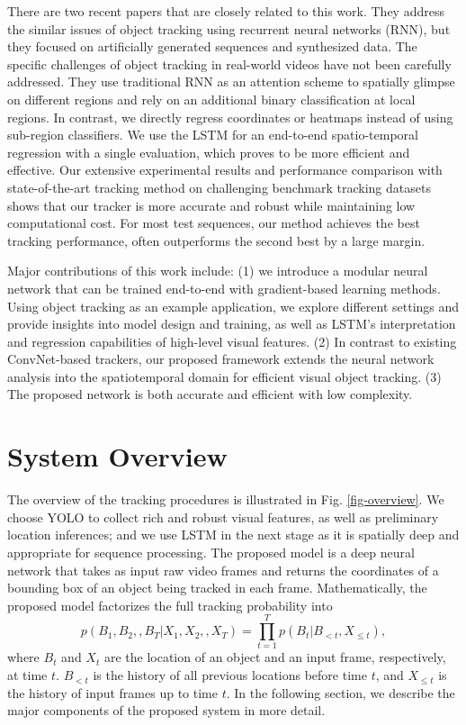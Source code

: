 \documentclass{article}
\begin{document}
There are two  recent papers \citep{kahou2015ratm, gan2015first} that are closely related to this work.
They address  the similar issues of object tracking using recurrent neural networks (RNN), but they focused on artificially generated sequences and synthesized data. The specific challenges of object tracking  in real-world videos have not been carefully addressed.
They use traditional RNN as an attention scheme to spatially glimpse on different regions and rely on an additional binary classification at local regions. In contrast, we directly regress coordinates or heatmaps instead of using sub-region classifiers. We use the LSTM for an end-to-end spatio-temporal regression with a single evaluation, which proves to be more efficient and effective.
Our extensive experimental results and performance comparison with state-of-the-art tracking method on challenging benchmark tracking datasets shows that our tracker is more accurate and robust while maintaining low computational cost. For most test sequences, our method achieves the best tracking performance, often outperforms the second best by a large margin.

Major contributions of this work include:
(1) we introduce a modular neural network that can be trained end-to-end with gradient-based learning methods. Using object tracking as an example application, we explore different settings and provide insights into model design and training, as well as LSTM's interpretation and regression capabilities of high-level visual features.
(2) In contrast to existing ConvNet-based trackers, our proposed framework extends the neural network analysis into the spatiotemporal domain for efficient visual object tracking.
(3) The proposed network is both accurate and efficient with low complexity.


\section{System Overview} \label{system-overview}


The overview of the tracking procedures is illustrated in Fig. \ref{fig-overview}.
We choose YOLO to collect rich and robust visual features, as well as preliminary location inferences; and we use LSTM in the next stage as it is spatially deep and appropriate for sequence processing.
The proposed model is a deep neural network that takes as input raw video frames and returns the coordinates of a bounding box of an object being tracked in each frame. Mathematically, the proposed model factorizes the full tracking probability into
\begin{equation}
      	p(B_{1}, B_{2}, , B_{T} | X_{1}, X_{2}, , X_{T}) = \prod_{t=1}^{T} p(B_{t} | B_{<t}, X_{\leq t}),
\end{equation}
where $B_{t}$ and $X_{t}$ are the location of an object and an input frame, respectively, at time $t$. $B_{<t}$ is the history of all previous locations before time $t$, and $X_{\leq t}$ is the history of input frames up to time $t$.
In the following section, we describe the major components of the proposed system in more detail.
\end{document}
